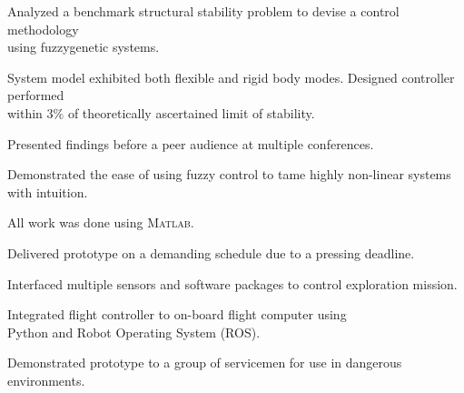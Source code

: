 \documentclass[letterpaper]{deedy-resume}
\begin{document}
\begin{minipage}[t]{\textwidth}
    \vspace*{2ex}
    \descript{}
    \begin{compactitem}
        \item Analyzed a benchmark structural stability problem to devise a control methodology\\  using fuzzy\textendash genetic systems.
        \item System model exhibited both flexible and rigid body modes. Designed controller performed\\ within 3\% of theoretically ascertained limit of stability.
        \item Presented findings before a peer audience at multiple conferences.
        \item Demonstrated the ease of using fuzzy control to tame highly non-linear systems with intuition.
        \item All work was done using \textsc{Matlab}.
    \end{compactitem}    

    \vspace*{2ex}
    \descript{}
    \begin{compactitem}
        \item Delivered prototype on a demanding schedule due to a pressing deadline.
        \item Interfaced multiple sensors and software packages to control exploration mission.
        \item Integrated flight controller to on-board flight computer using\\Python and Robot Operating System (ROS).
        \item Demonstrated prototype to a group of servicemen for use in dangerous environments.
    \end{compactitem}
    
    \vspace*{3em}

\end{minipage}
\end{document}
